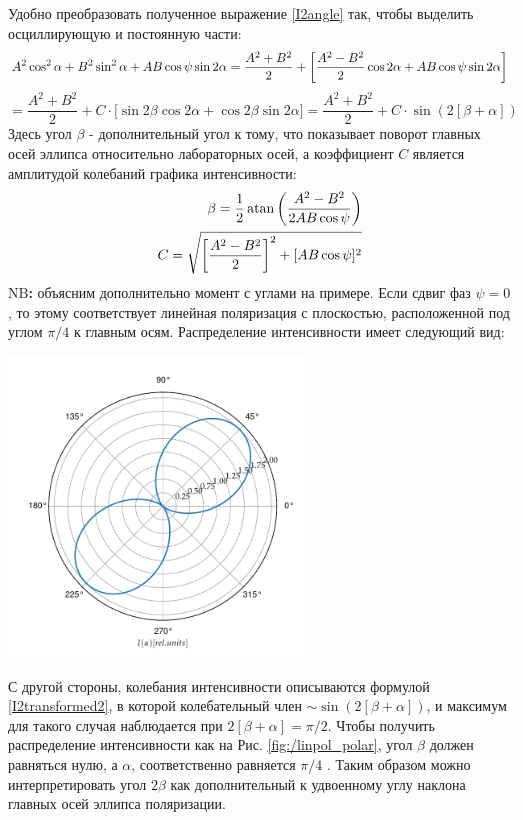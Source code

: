 \documentclass[12pt]{article}
\begin{document}
Удобно преобразовать полученное выражение \ref{I2angle} так, чтобы выделить осциллирующую и постоянную части:
\begin{equation}
A^2 \cos^2 \alpha + B^2 \sin^2 \alpha + AB \cos \psi \sin 2 \alpha = \frac{A^2 + B^2}{2} + \bigg[\frac{A^2 - B^2}{2} \cos 2\alpha + AB \cos \psi \sin 2 \alpha \bigg] \\\label{I2transformed1}
\end{equation}
\begin{equation}
= \frac{A^2 + B^2}{2} + C\cdot\big[\sin 2\beta \cos 2\alpha + \cos 2\beta \sin 2 \alpha\big] = \frac{A^2 + B^2}{2} + C\cdot \sin (2 [\beta + \alpha])
\label{I2transformed2}
\end{equation}
Здесь угол $\beta$ - дополнительный угол к тому, что показывает поворот главных осей эллипса относительно лабораторных осей, а коэффициент $C$ является амплитудой колебаний графика интенсивности:
\begin{align}
	\beta = \frac{1}{2}\atan\bigg(\frac{A^2 - B^2}{2AB\cos \psi}\bigg) \\
	 C = \sqrt{\bigg[\frac{A^2 - B^2}{2}\bigg]^2 + [AB \cos \psi]^2}
\end{align}
\textbf{$\mathrm{N}\!\!\mathrm{B}$:} объясним дополнительно момент с углами на примере. Если сдвиг фаз $\psi =0$, то этому соответствует линейная поляризация с плоскостью, расположенной под углом $\pi/4$ к главным осям. Распределение интенсивности имеет следующий вид: 
\begin{center}
	\includegraphics[width=8cm]{img/linpol_polar}
	\label{fig:/linpol_polar}
\end{center}
С другой стороны, колебания интенсивности описываются формулой \ref{I2transformed2}, в которой колебательный член $\sim \sin(2 [\beta + \alpha])$, и максимум для такого случая наблюдается при $2[\beta+\alpha]=\pi/2$.  Чтобы получить распределение интенсивности как на Рис. \ref{fig:/linpol_polar}, угол $\beta$ должен равняться нулю, а $\alpha$, соответственно равняется $\pi/4$ . Таким образом можно интерпретировать угол $2\beta$ как дополнительный к удвоенному углу наклона главных осей эллипса поляризации.
 
\end{document}
